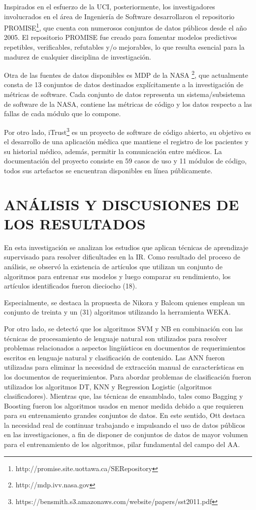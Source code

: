 \documentclass[journal]{IEEEtran}
\begin{document}
Inspirados en el esfuerzo de la UCI, posteriormente, los investigadores involucrados en el área de Ingeniería de Software desarrollaron el repositorio PROMISE\footnote{http://promise.site.uottawa.ca/SERepository}, que cuenta con numerosos conjuntos de datos públicos desde el año 2005. El repositorio PROMISE fue creado para fomentar modelos predictivos repetibles, verificables, refutables y/o mejorables, lo que resulta esencial para la madurez de cualquier disciplina de investigación. 

Otra de las fuentes de datos disponibles es MDP de la NASA \footnote{http://mdp.ivv.nasa.gov}, que actualmente consta de 13 conjuntos de datos destinados explícitamente a la investigación de métricas de software. Cada conjunto de datos representa un sistema/subsistema de software de la NASA, contiene las métricas de código y los datos respecto a las fallas de cada módulo que lo compone.

Por otro lado, iTrust\footnote{https://bensmith.s3.amazonaws.com/website/papers/sst2011.pdf} es un proyecto de software de código abierto, su objetivo es el desarrollo de una aplicación médica que mantiene el registro de los pacientes y su historial médico, además, permitir la comunicación entre médicos. La documentación del proyecto consiste en 59 casos de uso y 11 módulos de código, todos sus artefactos se encuentran disponibles en línea públicamente. 

\section{ANÁLISIS Y DISCUSIONES DE LOS RESULTADOS}

En esta investigación se analizan los estudios que aplican técnicas de aprendizaje supervisado para resolver dificultades en la IR. Como resultado del proceso de análisis, se observó la existencia de artículos que utilizan un conjunto de algoritmos para entrenar sus modelos y luego comparar su rendimiento, los artículos identificados fueron dieciocho (18).

Especialmente, se destaca la propuesta de Nikora y Balcom \cite{nikora2009automated} quienes emplean un conjunto de treinta y un (31) algoritmos utilizando la herramienta WEKA.

Por otro lado, se detectó que los algoritmos SVM y NB en combinación con las técnicas de procesamiento de lenguaje natural son utilizados para resolver problemas relacionados a aspectos lingüísticos en documentos de requerimientos escritos en lenguaje natural y clasificación de contenido. Las ANN fueron utilizadas para eliminar la necesidad de extracción manual de características en los documentos de requerimientos. Para abordar problemas de clasificación fueron utilizados los algoritmos DT, KNN y Regression Logistic (algoritmos clasificadores). Mientras que, las técnicas de ensamblado, tales como Bagging y Boosting fueron los algoritmos usados en menor medida debido a que requieren para su entrenamiento grandes conjuntos de datos. En este sentido, Ott \cite{Ott2013} destaca la necesidad real de continuar trabajando e impulsando el uso de datos públicos en las investigaciones, a fin de disponer de conjuntos de datos de mayor volumen para el entrenamiento de los algoritmos, pilar fundamental del campo del AA. 
\end{document}
